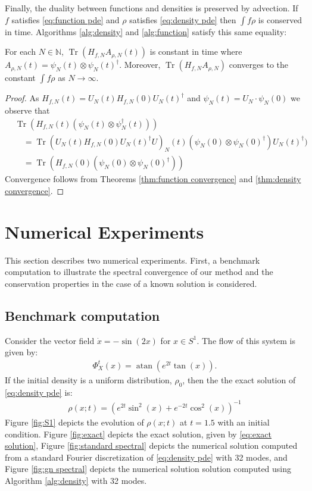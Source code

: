 \documentclass[final,leqno]{siamart}
\DeclareMathOperator{\Tr}{Tr}
\begin{document}
Finally, the duality between functions and densities is preserved by advection.  If $f$ satisfies \eqref{eq:function pde} and $\rho $ satisfies \eqref{eq:density pde} then $\int f \rho$ is conserved in time.
Algorithms \ref{alg:density} and \ref{alg:function} satisfy this same equality:
\begin{theorem}
	For each $N \in \mathbb{N}$, $\Tr( H_{f,N} A_{\rho,N} (t))$ is constant in time where $A_{\rho,N} (t)= \psi_{N}(t) \otimes \psi_{N}(t)^{\dagger}$.
	Moreover, $\Tr( H_{f,N} A_{\rho,N} )$ converges to the constant $\int f\rho $ as $N \to \infty$.
\end{theorem}
\begin{proof}
	As $H_{f,N}(t) = U_{N}(t) H_{f,N}(0) U_{N}(t)^{\dagger}$ and $\psi_{N}(t) = U_{N} \cdot \psi_{N}(0)$ we observe that
	\begin{align*}
		&\Tr( H_{f,N}(t) (\psi_{N} (t) \otimes \psi_{N}^{\dagger} (t) ) ) \\
		&\quad = \Tr(  U_{N}(t) H_{f,N}(0) U_{N}(t)^{\dagger} U)_{N}(t) (\psi_{N}(0) \otimes \psi_{N}(0)^{\dagger}) U_{N}(t)^{\dagger}) \\
		&\quad = \Tr( H_{f,N}(0) ( \psi_{N}(0) \otimes \psi_{N}(0)^{\dagger} ) )
	\end{align*}
	Convergence follows from Theorems \ref{thm:function convergence} and \ref{thm:density convergence}.
\end{proof}


\section{Numerical Experiments} \label{sec:numerics}

This section describes two numerical experiments.  First, a benchmark computation to illustrate the spectral convergence of our method and the conservation properties in the case of a known solution is considered.

\subsection{Benchmark computation}
\label{sec:benchmark}
Consider the vector field $\dot{x} = -\sin(2 x)$ for $x \in S^{1}$.
The flow of this system is given by:
\begin{align*}
	\Phi_{X}^{t}(x) = \operatorname{atan} \left( e^{2t} \tan( x) \right).
\end{align*}
If the initial density is a uniform distribution, $\rho_{0}$, then the the exact solution of \eqref{eq:density pde} is:
\begin{align}
	\rho(x;t) =  \left( e^{2t} \sin^{2}(x) + e^{-2t} \cos^{2}(x) \right)^{-1}  \label{eq:exact solution}
\end{align}
Figure \ref{fig:S1} depicts the evolution of $\rho(x;t)$ at $t=1.5$ with an initial condition.
Figure \ref{fig:exact} depicts the exact solution, given by \eqref{eq:exact solution},  Figure \ref{fig:standard spectral} depicts the numerical solution computed from a standard Fourier discretization of \eqref{eq:density pde} with 32 modes, and Figure \ref{fig:gn spectral} depicts the numerical solution solution computed using Algorithm \ref{alg:density} with 32 modes.
\end{document}
